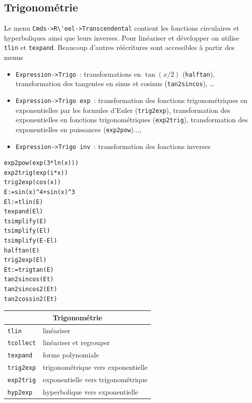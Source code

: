 \documentclass{article}
\begin{document}
\subsection{Trigonom\'etrie}
%
Le menu \verb|Cmds->R\'eel->Transcendental| contient 
les fonctions circulaires et hyperboliques ainsi que leurs inverses. 
Pour lin\'eariser et
d\'evelopper on utilise \verb|tlin| et \verb|texpand|. Beaucoup
d'autres r\'e\'ecritures sont accessibles \`a partir des menus
\begin{itemize}
\item 
\verb|Expression->Trigo|~: transformations en $\tan(x/2)$ ({\tt halftan}), transformation des tangentes en sinus et
cosinus ({\tt tan2sincos}), \ldots
\item 
\verb|Expression->Trigo exp|~: transformation des fonctions 
trigonom\'etriques en exponentielles par les
formules d'Euler ({\tt trig2exp}), transformation des exponentielles en fonctions trigonom\'etriques ({\tt exp2trig}), transformation des exponentielles en puissances ({\tt exp2pow})...,
\item 
\verb|Expression->Trigo inv|~: transformation des fonctions inverses
\end{itemize}
\begin{verbatim}
exp2pow(exp(3*ln(x)))
exp2trig(exp(i*x))
trig2exp(cos(x))
E:=sin(x)^4+sin(x)^3
El:=tlin(E)
texpand(El)
tsimplify(E)
tsimplify(El)
tsimplify(E-El)
halftan(E)
trig2exp(El)
Et:=trigtan(E)
tan2sincos(Et)
tan2sincos2(Et)
tan2cossin2(Et)
\end{verbatim}

\begin{center}
\begin{tabular}{|ll|}
\hline
\multicolumn{2}{|c|}{\bf Trigonom\'etrie}\\
\hline\hline
\verb|tlin| &lin\'eariser\\
\verb|tcollect| & lin\'eariser et regrouper\\
\verb|texpand| &forme polynomiale\\
\verb|trig2exp| &trigonom\'etrique vers exponentielle\\
\verb|exp2trig| &exponentielle vers trigonom\'etrique\\
\verb|hyp2exp| &hyperbolique vers exponentielle\\
\hline
\end{tabular}
\end{center}
%
\end{document}
